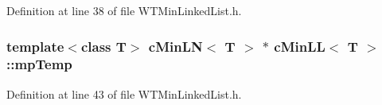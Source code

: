 Definition at line 38 of file WTMinLinkedList.h.

\hypertarget{classc_min_l_l_ad365aec0c8b0ae9e3fd5f91ad37594fb}{
\subsubsection[{mpTemp}]{\setlength{\rightskip}{0pt plus 5cm}template$<$class T$>$ {\bf cMinLN}$<$ T $>$ $\ast$ {\bf cMinLL}$<$ T $>$::{\bf mpTemp}}}
\label{classc_min_l_l_ad365aec0c8b0ae9e3fd5f91ad37594fb}


Definition at line 43 of file WTMinLinkedList.h.


